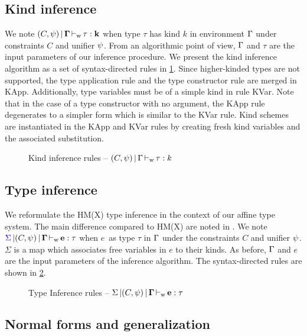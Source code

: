 \subsection{Kind inference}

We note $(C,\mathrm{\psi}) \operatorname{|} \bf{\Gamma} \operatorname{\vdash_w} \bf{\tau} : k$ when type $\tau$ has kind $k$
in environment $\Gamma$ under constraints $C$ and unifier $\mathrm{\psi}$. From an
algorithmic point of view, $\Gamma$ and $\tau$ are the input parameters of
our inference procedure.
We present the kind inference algorithm as a set of syntax-directed rules in
\cref{rules:kinding}.
Since higher-kinded types are not supported, the type application
rule and the type constructor rule are merged in {\sc KApp}.
Additionally, type variables must be of a simple kind in rule {\sc KVar}.
Note that in the case of a type constructor with no argument, the {\sc KApp}
rule degenerates to a simpler form which is similar to the {\sc KVar} rule.
Kind schemes are instantiated in the {\sc KApp} and {\sc KVar} rules by creating
fresh kind variables and the associated substitution.

\begin{figure}[h]
  \centering
  
  \caption{Kind inference rules -- $(C,\mathrm{\psi}) \operatorname{|} \Gamma \operatorname{\vdash_w} \tau : k$}
  \label{rules:kinding}
\end{figure}


\subsection{Type inference}

We reformulate the HM(X) type inference in the context of our affine type
system. The main difference compared to HM(X) are noted in .
We note ${\color{blue}{\Sigma}} \operatorname{|} (C,\mathrm{\psi}) \operatorname{|} \bf{\Gamma} \operatorname{\vdash_w} \bf{e} : \tau$ when
$e$\ as type $\tau$ in $\Gamma$ under the constraints $C$ and unifier $\mathrm{\psi}$.
$\Sigma$ is a map which associates free variables in $e$ to
their kinds.
As before, $\Gamma$ and $e$ are the input parameters of the inference
algorithm. The syntax-directed rules are shown in \cref{rules:typing}.

\begin{figure*}[h]
  
  \caption{Type Inference rules -- $\Sigma \operatorname{|} (C,\psi) \operatorname{|} \bf{\Gamma} \operatorname{\vdash_w} \bf{e} : \tau$ }
  \label{rules:typing}
\end{figure*}

\subsection{Normal forms and generalization}
\label{sec:normalize}


